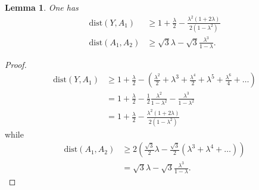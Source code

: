 \documentclass{article}
\newcommand{\enclose}[1]{\left(#1\right)}
\newcommand{\dist}{\mathrm{dist}}
\newtheorem{lemma}[theorem]{Lemma}
\theoremstyle{definition}
\theoremstyle{remark}
\begin{document}
\begin{lemma}\label{lm:precedente1}
One has
\begin{align*}
    \dist(Y,A_1) & \ge 
    1+ \frac{\lambda} 2 
    - \frac{\lambda^2(1+2\lambda)}{2(1-\lambda^2)}\\
    \dist(A_1,A_2) & 
    \ge 
    \sqrt 3 \lambda - \sqrt 3 \frac{\lambda^3}{1-\lambda}.
\end{align*}
\end{lemma}
\begin{proof}
  \begin{align*}
  \dist(Y,A_1) &\ge 1+ \frac \lambda 2 
     - \enclose{\frac{\lambda^2}{2} 
      + \lambda^3 
      + \frac{\lambda^4 }{2}
      + \lambda^5
      + \frac{\lambda^6}{4} + \dots}\\
      &= 1 + \frac \lambda 2 
      - \frac{1}{2}\frac{\lambda^2}{1-\lambda^2}
      - \frac{\lambda^3}{1-\lambda^2}\\
      &= 1+ \frac{\lambda} 2 
      - \frac{\lambda^2(1+2\lambda)}{2(1-\lambda^2)}
  \end{align*}
  while 
  \begin{align*}
    \dist(A_1,A_2)
    &\ge 2\enclose{\frac{\sqrt 3}{2} \lambda 
      -\frac{\sqrt 3}{2}\enclose{\lambda^3 + \lambda^4 + \dots}
     }\\
    &= \sqrt 3 \lambda -\sqrt 3 \frac{\lambda^3}{1-\lambda}.
  \end{align*}
\end{proof}
\end{document}
